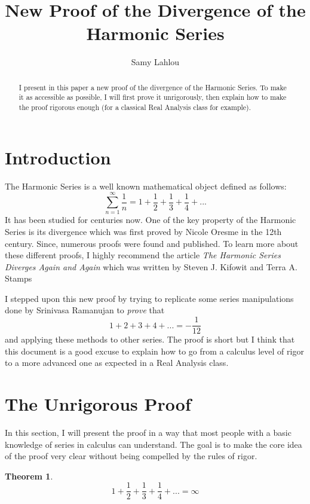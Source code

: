 \documentclass[10pt]{article}
\title{New Proof of the Divergence of the Harmonic Series}
\author{Samy Lahlou}
\date{}
\theoremstyle{definition}
\newtheorem*{theorem}{Theorem}
\begin{document}
\maketitle

\begin{abstract}
    I present in this paper a new proof of the divergence of the Harmonic Series. To make it as accessible as possible, I will first prove it unrigorously, then explain how to make the proof rigorous enough (for a classical Real Analysis class for example).
\end{abstract}

\tableofcontents

\newpage

\section{Introduction}
The Harmonic Series is a well known mathematical object defined as follows:
$$\sum_{n=1}^{\infty}\frac{1}{n} = 1 + \frac{1}{2} + \frac{1}{3} + \frac{1}{4} + ...$$
It has been studied for centuries now. One of the key property of the Harmonic Series is its divergence which was first proved by Nicole Oresme in the 12th century. Since, numerous proofs were found and published. To learn more about these different proofs, I highly recommend the article \textit{The Harmonic Series Diverges Again and Again} which was written by Steven J. Kifowit and Terra A. Stamps \cite{harmonicseries} 

I stepped upon this new proof by trying to replicate some series manipulations done by Srinivasa Ramanujan to \textit{prove} that
$$1 + 2 + 3 + 4 + ... = -\frac{1}{12}$$
and applying these methods to other series. The proof is short but I think that this document is a good excuse to explain how to go from a calculus level of rigor to a more advanced one as expected in a Real Analysis class.

\section{The Unrigorous Proof}

In this section, I will present the proof in a way that most people with a basic knowledge of series in calculus can understand. The goal is to make the core idea of the proof very clear without being compelled by the rules of rigor. 

\begin{theorem}
    $$ 1 + \frac{1}{2} + \frac{1}{3} + \frac{1}{4} + ... = \infty$$
\end{theorem}
\end{document}
